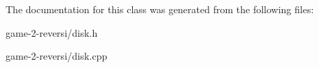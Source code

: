 The documentation for this class was generated from the following files\-:\begin{DoxyCompactItemize}
\item 
game-\/2-\/reversi/disk.\-h\item 
game-\/2-\/reversi/disk.\-cpp\end{DoxyCompactItemize}
